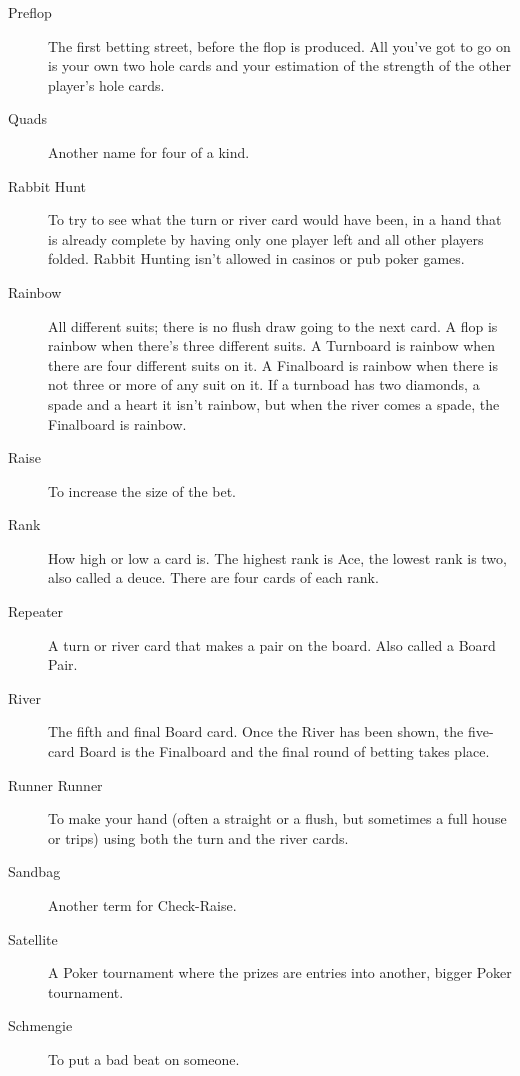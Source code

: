 \begin{description}
\item[Preflop] The first betting street, before the flop is produced.
All you've got to go on is your own two hole cards and your estimation
of the strength of the other player's hole cards.

\item[Quads] Another name for four of a kind.

\item[Rabbit Hunt] To try to see what the turn or river card would
have been, in a hand that is already complete by having only one
player left and all other players folded. Rabbit Hunting isn't allowed
in casinos or pub poker games.

\item[Rainbow] All different suits; there is no flush
draw going to the next card. A flop is rainbow when there's three
different suits. A Turnboard is rainbow when there are four different
suits on it. A Finalboard is rainbow when there is not
three or more of any suit on it. If a turnboad has two diamonds, a
spade and a heart it isn't rainbow, but when the river comes a spade,
the Finalboard is rainbow.

\item[Raise] To increase the size of the bet.

\item[Rank] How high or low a card is. The highest rank is Ace, the
lowest rank is two, also called a deuce. There are four cards of
each rank.

\item[Repeater] A turn or river card that makes a pair on the
board. Also called a Board Pair.

\item[River] The fifth and final Board card. Once the River has been
shown, the five-card Board is the Finalboard and the final round of
betting takes place.

\item[Runner Runner] To make your hand (often a straight or a flush,
but sometimes a full house or trips) using both the turn and the
river cards.

\item[Sandbag] Another term for Check-Raise.

\item[Satellite] A Poker tournament where the prizes are entries into
another, bigger Poker tournament.

\item[Schmengie] To put a bad beat on someone.


\end{description}
